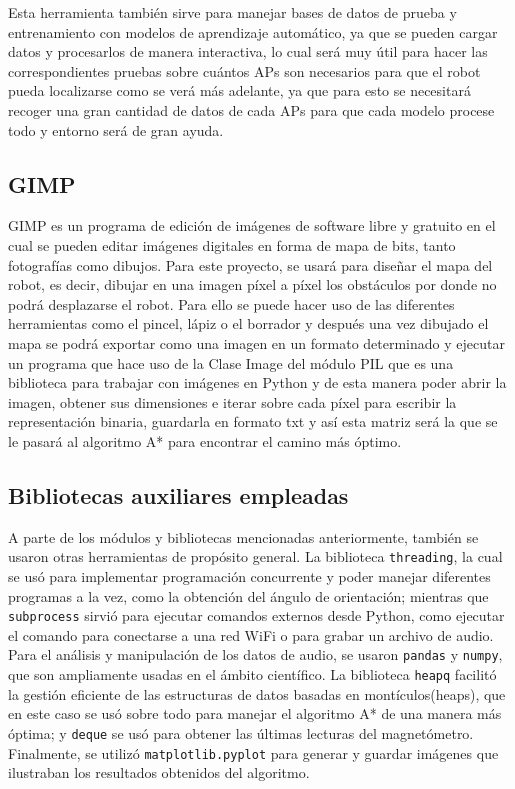 Esta herramienta también sirve para manejar bases de datos de prueba y entrenamiento con modelos de aprendizaje automático, ya que se pueden cargar datos y procesarlos de manera interactiva, lo cual será muy útil para hacer las correspondientes pruebas sobre cuántos APs son necesarios para que el robot pueda localizarse como se verá más adelante, ya que para esto se necesitará recoger una gran cantidad de datos de cada APs para que cada modelo procese todo y entorno será de gran ayuda.


\subsection{GIMP}
\label{subsec:gimp}

GIMP es un programa de edición de imágenes de software libre y gratuito en el cual se pueden editar imágenes digitales en forma de mapa de bits, tanto fotografías como dibujos. Para este proyecto, se usará para diseñar el mapa del robot, es decir, dibujar en una imagen píxel a píxel los obstáculos por donde no podrá desplazarse el robot. Para ello se puede hacer uso de las diferentes herramientas como el pincel, lápiz o el borrador y después una vez dibujado el mapa se podrá exportar como una imagen en un formato determinado y ejecutar un programa que hace uso de la Clase Image del módulo PIL que es una biblioteca para trabajar con imágenes en Python y de esta manera poder abrir la imagen, obtener sus dimensiones e iterar sobre cada píxel para escribir la representación binaria, guardarla en formato txt y así esta matriz será la que se le pasará al algoritmo A* para encontrar el camino más óptimo.


\subsection{Bibliotecas auxiliares empleadas}
\label{subsec:bibliotecas}

A parte de los módulos y bibliotecas mencionadas anteriormente, también se usaron otras herramientas de propósito general. La biblioteca \texttt{threading}, la cual se usó para implementar programación concurrente y poder manejar diferentes programas a la vez, como la obtención del ángulo de orientación; mientras que \texttt{subprocess} sirvió para ejecutar comandos externos desde Python, como ejecutar el comando para conectarse a una red WiFi o para grabar un archivo de audio. Para el análisis y manipulación de los datos de audio, se usaron \texttt{pandas} y \texttt{numpy}, que son ampliamente usadas en el ámbito científico. La biblioteca \texttt{heapq} facilitó la gestión eficiente de las estructuras de datos basadas en montículos(heaps), que en este caso se usó sobre todo para manejar el algoritmo A* de una manera más óptima; y \texttt{deque} se usó para obtener las últimas lecturas del magnetómetro. Finalmente, se utilizó \texttt{matplotlib.pyplot} para generar y guardar imágenes que ilustraban los resultados obtenidos del algoritmo.\\

